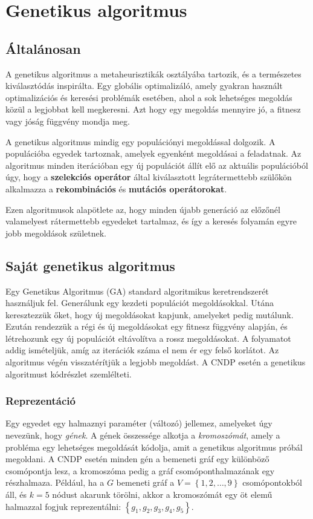 \section{Genetikus algoritmus}\label{sec:GENETIKUS_ALGORITMUS}


\subsection{Általánosan}
A genetikus algoritmus a metaheurisztikák osztályába tartozik, és a természetes kiválasztódás inspirálta.
Egy globális optimalizáló, amely gyakran használt optimalizációs és keresési problémák esetében,
ahol a sok lehetséges megoldás közül a legjobbat kell megkeresni.
Azt hogy egy megoldás mennyire jó, a fitnesz vagy jóság függvény mondja meg.

A genetikus algoritmus mindig egy populációnyi megoldással dolgozik.
A populációba egyedek tartoznak, amelyek egyenként megoldásai a feladatnak.
Az algoritmus minden iterációban egy új populációt állít elő az aktuális populációból úgy,
hogy a \textbf{szelekciós operátor} által kiválasztott legrátermettebb szülőkön alkalmazza a
\textbf{rekombinációs} és \textbf{mutációs operátorokat}.

Ezen algoritmusok alapötlete az, hogy minden újabb generáció
az előzőnél valamelyest rátermettebb egyedeket tartalmaz, és így a keresés folyamán
egyre jobb megoldások születnek.


\subsection{Saját genetikus algoritmus}
Egy Genetikus Algoritmus (GA) standard algoritmikus keretrendszerét használjuk fel.
Generálunk egy kezdeti populációt megoldásokkal. Utána keresztezzük őket, hogy új megoldásokat kapjunk,
amelyeket pedig mutálunk. Ezután rendezzük a régi és új megoldásokat egy fitnesz függvény alapján,
és létrehozunk egy új populációt eltávolítva a rossz megoldásokat.
A folyamatot addig ismételjük, amíg az iterációk száma el nem ér egy felső korlátot.
Az algoritmus végén visszatérítjük a legjobb megoldást.
A CNDP esetén a genetikus algoritmust  kódrészlet szemlélteti.



\subsubsection{Reprezentáció}
Egy egyedet egy halmaznyi paraméter (változó) jellemez, amelyeket úgy nevezünk, hogy \textit{gének}.
A gének összessége alkotja a \textit{kromoszómát}, amely a probléma egy lehetséges megoldását kódolja, amit a genetikus algoritmus próbál megoldani.
A CNDP esetén minden gén a bemeneti gráf egy különböző csomópontja lesz, a kromoszóma pedig a gráf csomóponthalmazának egy részhalmaza.
Például, ha a $G$ bemeneti gráf a $V = \left\{ 1, 2, \dotsc, 9 \right\}$ csomópontokból áll, és $k = 5$ nódust akarunk törölni,
akkor a kromoszómát egy öt elemű halmazzal fogjuk reprezentálni: $\left\{g_1,g_2,g_3,g_4,g_5\right\}$.


